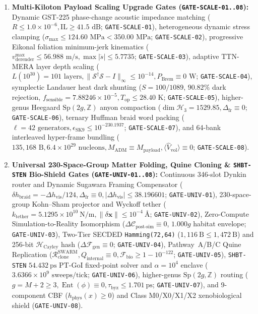 \documentclass[11pt,onecolumn]{article}
\begin{document}
\begin{enumerate}
    \item \textbf{Multi-Kiloton Payload Scaling Upgrade Gates (\texttt{GATE-}\allowbreak\texttt{SCALE-01..08}):} Dynamic GST-225 phase-change acoustic impedance matching ($R \le 1.0\times 10^{-6}, \text{IL} \ge 41.5\text{ dB}$; \texttt{GATE-SCALE-01}), heterogeneous dynamic stress clamping ($\sigma_{\max} \le 124.60\text{ MPa} < 350.00\text{ MPa}$; \texttt{GATE-SCALE-02}), progressive Eikonal foliation minimum-jerk kinematics ($v_{\text{derender}}^{\max} \le 56.988\text{ m/s}, \max |\ddot{s}| \le 5.7735$; \texttt{GATE-SCALE-03}), adaptive TTN-MERA layer depth scaling ($L(10^{30}) = 101\text{ layers}, \|\mathcal{S}^\dagger \mathcal{S} - I\|_\infty \le 10^{-14}, P_{\text{Brem}} \equiv 0\text{ W}$; \texttt{GATE-SCALE-04}), symplectic Landauer heat dark shunting ($S = 100/1089$, $90.82\%$ dark rejection, $f_{\text{sensible}} = 7.88246\times 10^{-5}, T_{\text{op}} \le 28.40\text{ K}$; \texttt{GATE-SCALE-05}), higher-genus Heegaard $\mathrm{Sp}(2g, \mathbb{Z})$ anyon compaction ($\dim \mathcal{H}_3 = 1529.85, \Delta_{\text{fr}} \equiv 0$; \texttt{GATE-SCALE-06}), ternary Huffman braid word packing ($\ell = 42\text{ generators}, \epsilon_{\text{SK9}} \le 10^{-230.1937}$; \texttt{GATE-SCALE-07}), and 64-bank interleaved hyper-frame bundling ($135{,}168\text{ B}, 6.4\times 10^{29}\text{ nucleons}, M_{\text{ADM}} \equiv M_{\text{payload}}, \langle\hat{V}_{\text{vol}}\rangle \equiv 0$; \texttt{GATE-SCALE-08}).
    \item \textbf{Universal 230-Space-Group Matter Folding, Quine Cloning \& \texttt{SHBT-STEN} Bio-Shield Gates (\texttt{GATE-}\allowbreak\texttt{UNIV-01..08}):} Continuous 346-slot Dynkin router and Dynamic Sugawara Framing Compensator ($\delta h_{\text{braid}} = -\Delta h_{\text{vis}}/124, \Delta_{\text{fr}} \equiv 0, |\Delta h_{\text{vis}}| \le 38.196601$; \texttt{GATE-UNIV-01}), 230-space-group Kohn--Sham projector and Wyckoff tether ($k_{\text{tether}} = 5.1295\times 10^{10}~\text{N/m}, \|\delta\mathbf{x}\| \le 10^{-4}~\text{\AA}$; \texttt{GATE-UNIV-02}), Zero-Compute Simulation-to-Reality Isomorphism ($\Delta\mathcal{C}_{\text{post-sim}} \equiv 0$, $1.000g$ habitat envelope; \texttt{GATE-UNIV-03}), Two-Tier SECDED \texttt{Hamming(72,64)} ($1{,}116~\text{B} \le 1{,}472~\text{B}$) and 256-bit $\mathcal{H}_{\text{Cayley}}$ hash ($\Delta\mathcal{F}_{\text{gen}} \equiv 0$; \texttt{GATE-UNIV-04}), Pathway~A/B/C Quine Replication ($\mathcal{R}_{\text{clone}}^{\text{SWARM}}, Q_{\text{internal}} \equiv 0, \mathcal{F}_{\text{bio}} \ge 1 - 10^{-122}$; \texttt{GATE-UNIV-05}), \texttt{SHBT-STEN} $54.432~\text{ps}$ PT-GoI fixed-point solver and $\alpha = 10^4$ enclave ($3.6366\times 10^9\text{ sweeps/tick}$; \texttt{GATE-UNIV-06}), higher-genus $\mathrm{Sp}(2g, \mathbb{Z})$ routing ($g = M + 2 \ge 3, \operatorname{Ent}(\phi) \equiv 0, \tau_{\text{byz}} \le 1.701~\text{ps}$; \texttt{GATE-UNIV-07}), and 9-component CBF ($h_{\text{phys}}(x) \ge 0$) and Class M0/X0/X1/X2 xenobiological shield (\texttt{GATE-UNIV-08}).

\end{enumerate}
\end{document}
